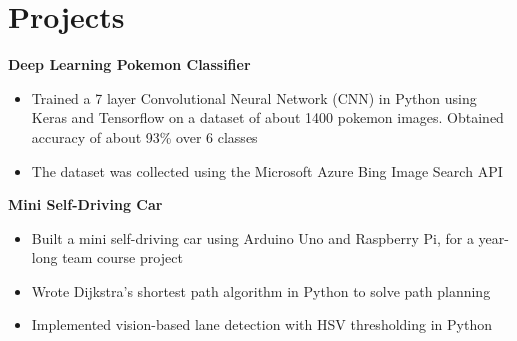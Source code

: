 \documentclass[letterpaper,11pt]{article}
\begin{document}

  


\section{\color{BlueViolet} Projects}
    \small
    \textbf{Deep Learning Pokemon Classifier} 
    \vspace{-4pt}
        \begin{itemize}
            \item Trained a 7 layer Convolutional Neural Network (CNN) in Python using Keras and Tensorflow on a dataset of about 1400 pokemon images. Obtained accuracy of about 93\% over 6 classes
            \vspace{-3pt}
            \item The dataset was collected using the Microsoft Azure Bing Image Search API
        \end{itemize}
    \vspace{-2pt}
    
    \textbf{Mini Self-Driving Car} 
    \vspace{-4pt}
        \begin{itemize}
            \item Built a mini self-driving car using Arduino Uno and Raspberry Pi, for a year-long team course project
            \vspace{-3pt}
            \item Wrote Dijkstra's shortest path algorithm in Python to solve path planning
            \vspace{-3pt}
            \item Implemented vision-based lane detection with HSV thresholding in Python
        \end{itemize}
    \vspace{-2pt}
    
\end{document}
